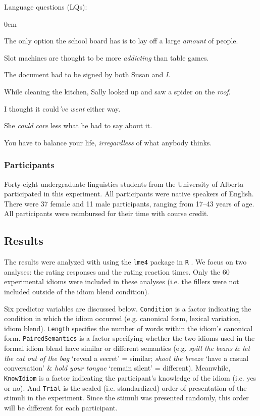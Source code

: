 \documentclass[output=paper
,modfonts
,nonflat]{langsci/langscibook}
\begin{document}
{\sc Language questions} (LQs):
\begin{enumerate}
\small{
\itemsep0em
\item The only option the school board has is to lay off a large \textit{amount} of people.
\item Slot machines are thought to be more \textit{addicting} than table games.
\item The document had to be signed by both Susan and \textit{I}.
\item While cleaning the kitchen, Sally looked up and saw a spider on the \textit{roof}.
\item I thought it could\textit{'ve went} either way.
\item She \textit{could care} less what he had to say about it.
\item You have to balance your life, \textit{irregardless} of what anybody thinks.
}
\end{enumerate}


\subsubsection{Participants}

Forty-eight undergraduate linguistics students from the University of Alberta participated in this experiment. All participants were native speakers of English. There were 37 female and 11 male participants, ranging from 17--43 years of age. All participants were reimbursed for their time with course credit.


\subsection{Results}

The results were analyzed with  using the \texttt{lme4} package \citep{BatesEtAl2015} in \texttt{R} \citep{R}. We focus on two analyses: the rating responses and the rating reaction times. Only the 60 experimental idioms were included in these analyses (i.e. the fillers were not included outside of the idiom blend condition). %

Six predictor variables are discussed below. \texttt{Condition} is a factor indicating the condition in which the idiom occurred (e.g. canonical form, lexical variation, idiom blend). \texttt{Length} specifies the number of words within the idiom's canonical form. \texttt{PairedSemantics} is a factor specifying whether the two idioms used in the formal idiom blend have similar or different semantics (e.g. \textit{spill the beans} \& \textit{let the cat out of the bag} `reveal a secret' = similar; \textit{shoot the breeze} `have a casual conversation' \& \textit{hold your tongue} `remain silent' = different). Meanwhile, \texttt{KnowIdiom} is a factor indicating the participant's knowledge of the idiom (i.e. yes or no). And \texttt{Trial} is the scaled (i.e. standardized) order of presentation of the stimuli in the experiment. Since the stimuli was presented randomly, this order will be different for each participant. 
\end{document}
